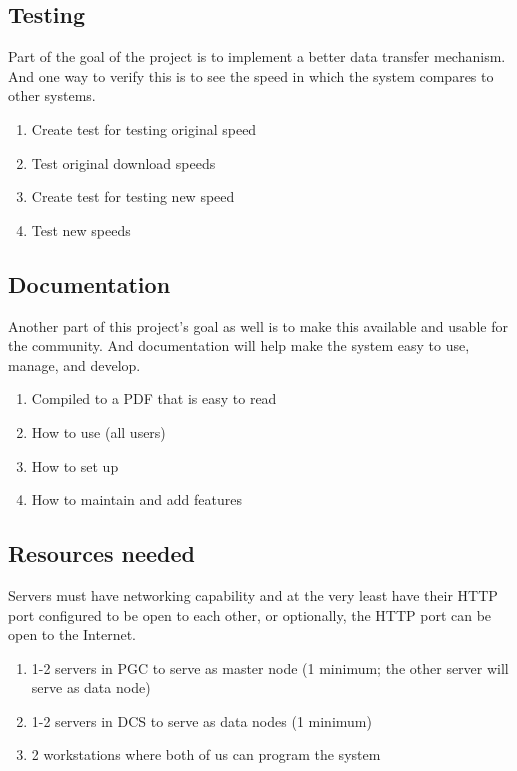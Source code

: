 \documentclass{article}
\begin{document}
\subsection{Testing}
Part of the goal of the project is to implement a better data transfer mechanism. And one way to verify this is to see the speed in which the system compares to other systems.

\begin{enumerate}
    \item Create test for testing original speed
    \item Test original download speeds
    \item Create test for testing new speed
    \item Test new speeds
\end{enumerate}


\subsection{Documentation}
Another part of this project's goal as well is to make this available and usable for the community. And documentation will help make the system easy to use, manage, and develop.
\begin{enumerate}
    \item Compiled to a PDF that is easy to read
    \item How to use (all users)
    \item How to set up
    \item How to maintain and add features
\end{enumerate}

\subsection{Resources needed}

Servers must have networking capability and at the very least have their HTTP port configured to be open to each other, or optionally, the HTTP port can be open to the Internet.
\begin{enumerate}
    \item 1-2 servers in PGC to serve as master node (1 minimum; the other server will serve as data node)
    \item 1-2 servers in DCS to serve as data nodes (1 minimum)
    \item 2 workstations where both of us can program the system
    \end{enumerate}

\printbibliography
\end{document}
